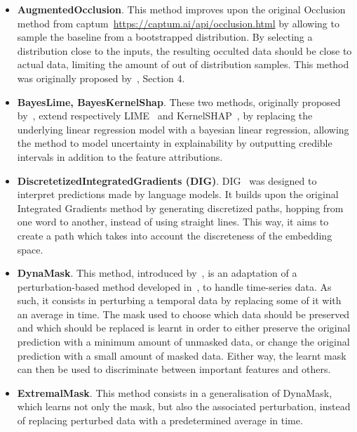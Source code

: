 \begin{itemize}
    \item \textbf{AugmentedOcclusion}.
        This method improves upon the original Occlusion method from captum~\url{https://captum.ai/api/occlusion.html}
        by allowing to sample the baseline from a bootstrapped distribution.
        By selecting a distribution close to the inputs, the resulting occulted data should be close to actual data,
        limiting the amount of out of distribution samples.
        This method was originally proposed by~\citep{tonekaboni2020went}, Section 4.
    \item \textbf{BayesLime, BayesKernelShap}.
        These two methods, originally proposed by~\citep{slack2021reliable}, extend respectively
        LIME~\citep{ribeiro2016should} and KernelSHAP~\citep{lundberg2017unified}, by replacing the underlying
        linear regression model with a bayesian linear regression, allowing the method to model uncertainty in
        explainability by outputting credible intervals in addition to the feature attributions.
    \item \textbf{DiscretetizedIntegratedGradients (DIG)}.
        DIG~\citep{sanyal2021discretized} was designed to interpret predictions made by language models.
        It builds upon the original Integrated Gradients method by generating discretized paths, hopping from one
        word to another, instead of using straight lines.
        This way, it aims to create a path which takes into account the discreteness of the embedding space.
    \item \textbf{DynaMask}.
        This method, introduced by~\citep{crabbe2021explaining}, is an adaptation of a perturbation-based method
        developed in~\citep{fong2017interpretable, fong2019understanding}, to handle time-series data.
        As such, it consists in perturbing a temporal data by replacing some of it with an average in time.
        The mask used to choose which data should be preserved and which should be replaced is learnt in order to either
        preserve the original prediction with a minimum amount of unmasked data, or change the original prediction with
        a small amount of masked data.
        Either way, the learnt mask can then be used to discriminate between important features and others.
    \item \textbf{ExtremalMask}.
        This method consists in a generalisation of DynaMask, which learns not only the mask, but also the associated
        perturbation, instead of replacing perturbed data with a predetermined average in time.

\end{itemize}
